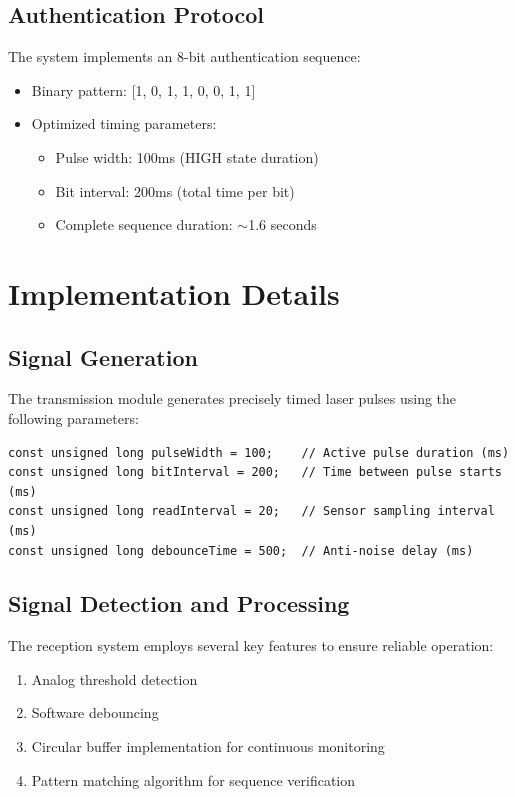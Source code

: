 \documentclass[12pt,a4paper]{article}
\begin{document}
\subsection{Authentication Protocol}
The system implements an 8-bit authentication sequence:
\begin{itemize}
    \item Binary pattern: [1, 0, 1, 1, 0, 0, 1, 1]
    \item Optimized timing parameters:
    \begin{itemize}
        \item Pulse width: 100ms (HIGH state duration)
        \item Bit interval: 200ms (total time per bit)
        \item Complete sequence duration: $\sim$1.6 seconds
    \end{itemize}
\end{itemize}

\section{Implementation Details}
\subsection{Signal Generation}
The transmission module generates precisely timed laser pulses using the following parameters:
\begin{verbatim}
const unsigned long pulseWidth = 100;    // Active pulse duration (ms)
const unsigned long bitInterval = 200;   // Time between pulse starts (ms)
const unsigned long readInterval = 20;   // Sensor sampling interval (ms)
const unsigned long debounceTime = 500;  // Anti-noise delay (ms)
\end{verbatim}

\subsection{Signal Detection and Processing}
The reception system employs several key features to ensure reliable operation:
\begin{enumerate}
    \item Analog threshold detection
    \item Software debouncing
    \item Circular buffer implementation for continuous monitoring
    \item Pattern matching algorithm for sequence verification
\end{enumerate}
\end{document}
